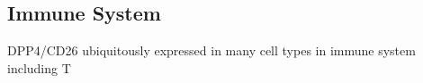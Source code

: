 \subsection{Immune System}
DPP4/CD26 ubiquitously expressed in many cell types in immune system including T